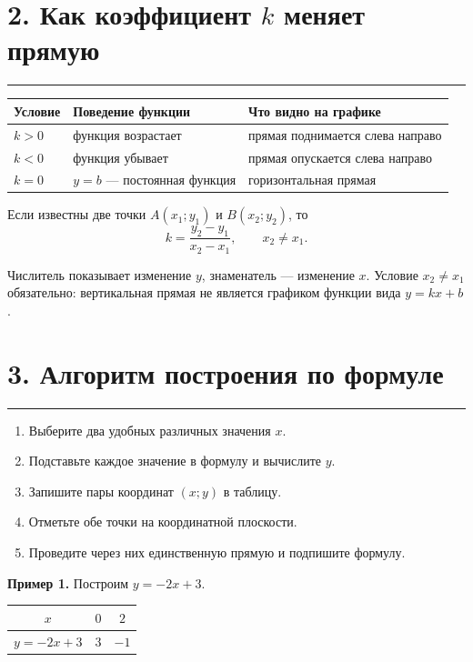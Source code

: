 \documentclass[a4paper,12pt]{article}
\newcommand{\sectionline}{\par\vspace{2pt}\textcolor{accent}{\rule{\linewidth}{0.8pt}}\vspace{5pt}}
\newcommand{\key}[1]{\textcolor{darkaccent}{\textbf{#1}}}
\begin{document}
\section*{2. Как коэффициент $k$ меняет прямую}
\sectionline

\begin{center}
\renewcommand{\arraystretch}{1.4}
\begin{tabularx}{\linewidth}{@{}>{\bfseries}l X X@{}}
\toprule
Условие & Поведение функции & Что видно на графике \\
\midrule
$k>0$ & функция возрастает & прямая поднимается слева направо \\
$k<0$ & функция убывает & прямая опускается слева направо \\
$k=0$ & $y=b$ --- постоянная функция & горизонтальная прямая \\
\bottomrule
\end{tabularx}
\end{center}

Если известны две точки $A(x_1;y_1)$ и $B(x_2;y_2)$, то
\[
  \boxed{k=\frac{y_2-y_1}{x_2-x_1}},\qquad x_2\ne x_1.
\]

Числитель показывает изменение $y$, знаменатель --- изменение $x$. Условие
$x_2\ne x_1$ обязательно: вертикальная прямая не является графиком функции
вида $y=kx+b$.

\section*{3. Алгоритм построения по формуле}
\sectionline

\begin{enumerate}
  \item Выберите два удобных различных значения $x$.
  \item Подставьте каждое значение в формулу и вычислите $y$.
  \item Запишите пары координат $(x;y)$ в таблицу.
  \item Отметьте обе точки на координатной плоскости.
  \item Проведите через них единственную прямую и подпишите формулу.
\end{enumerate}

\key{Пример 1.} Построим $y=-2x+3$.

\begin{center}
\renewcommand{\arraystretch}{1.35}
\begin{tabular}{@{}ccc@{}}
\toprule
$x$ & $0$ & $2$ \\
\midrule
$y=-2x+3$ & $3$ & $-1$ \\
\bottomrule
\end{tabular}
\end{center}
\end{document}
